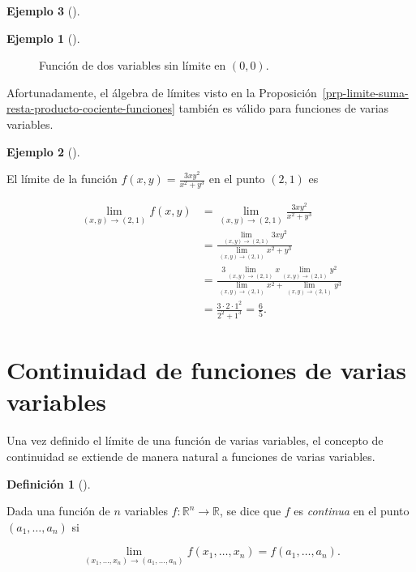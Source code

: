 \documentclass[
  a4paper,
]{scrreport}
\theoremstyle{definition}
\newtheorem{example}{Ejemplo}[chapter]
\theoremstyle{plain}
\theoremstyle{definition}
\newtheorem{definition}{Definición}[chapter]
\theoremstyle{definition}
\theoremstyle{plain}
\theoremstyle{plain}
\theoremstyle{remark}
\begin{document}
\begin{example}[]
\begin{example}[]
\begin{figure}
{}

\caption{\label{fig-no-existencia-limite-2}Función de dos variables sin
límite en \((0,0)\).}

\end{figure}%

\end{example}

Afortunadamente, el álgebra de límites visto en la
Proposición~\ref{prp-limite-suma-resta-producto-cociente-funciones}
también es válido para funciones de varias variables.

\begin{example}[]\protect\hypertarget{exm-algebra-limites-funciones-varias-variables}{}\label{exm-algebra-limites-funciones-varias-variables}

El límite de la función \(f(x,y)=\frac{3xy^2}{x^2+y^3}\) en el punto
\((2,1)\) es

\begin{align*}
\lim_{(x,y)\to(2,1)} f(x,y) 
&= \lim_{(x,y)\to(2,1)} \frac{3xy^2}{x^2+y^3} \\
&= \frac{\lim_{(x,y)\to(2,1)} 3xy^2}{\lim_{(x,y)\to(2,1)} x^2+y^3} \\
&= \frac{3\lim_{(x,y)\to(2,1)} x\lim_{(x,y)\to(2,1)}y^2}{\lim_{(x,y)\to(2,1)} x^2+\lim_{(x,y)\to(2,1)}y^3} \\
&= \frac{3\cdot 2\cdot 1^2}{2^2 + 1^3} 
= \frac{6}{5}.
\end{align*}

\end{example}

\section{Continuidad de funciones de varias
variables}\label{continuidad-de-funciones-de-varias-variables}

Una vez definido el límite de una función de varias variables, el
concepto de continuidad se extiende de manera natural a funciones de
varias variables.

\begin{definition}[]\protect\hypertarget{def-funcion-varias-variables-continua}{}\label{def-funcion-varias-variables-continua}

Dada una función de \(n\) variables
\(f:\mathbb{R}^n\rightarrow \mathbb{R}\), se dice que \(f\) es
\emph{continua} en el punto \((a_1, \ldots, a_n)\) si

\[
\lim_{(x_1,\ldots,x_n)\rightarrow (a_1,\ldots,a_n)}f(x_1,\ldots,x_n) = f(a_1,\ldots, a_n).
\]


\end{definition}
\end{example}
\end{document}
